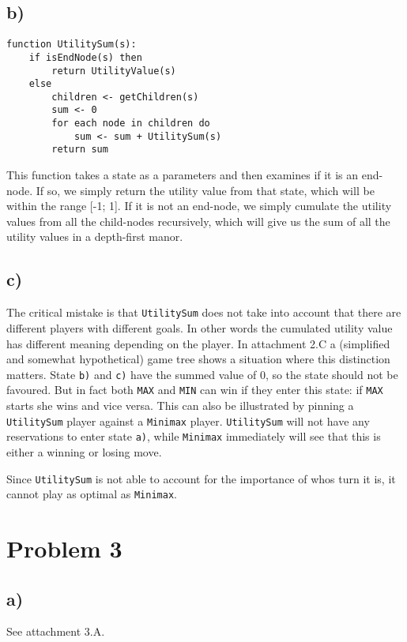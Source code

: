 \documentclass[12pt,a4paper]{article}
\begin{document}
\subsection*{b)}
\begin{lstlisting}[frame=single]
function UtilitySum(s):
    if isEndNode(s) then
        return UtilityValue(s)
    else
        children <- getChildren(s)
        sum <- 0
        for each node in children do
            sum <- sum + UtilitySum(s)
        return sum
\end{lstlisting}
This function takes a state as a parameters and then examines if it is an
end-node. If so, we simply return the utility value from that state, which
will be within the range [-1; 1].
If it is not an end-node, we simply cumulate the utility values from
all the child-nodes recursively, which will give us the sum of all the
utility values in a depth-first manor.

\subsection*{c)}
The critical mistake is that \texttt{UtilitySum} does not take into
account that there are different players with different goals. In
other words the cumulated utility value has different meaning depending
on the player. In attachment 2.C a (simplified and somewhat hypothetical)
game tree shows a
situation where this distinction matters. State \texttt{b)} and \texttt{c)}
have the summed value of 0, so the state should not be favoured. But in fact
both \texttt{MAX} and \texttt{MIN} can win if they enter this state: if
\texttt{MAX} starts she wins and vice versa. This can also be illustrated
by pinning a \texttt{UtilitySum} player against a \texttt{Minimax} player.
\texttt{UtilitySum} will not have any reservations to enter state \texttt{a)},
while \texttt{Minimax} immediately will see that this is either a winning
or losing move.

Since \texttt{UtilitySum} is not
able to account for the importance of whos turn it is, it cannot play as
optimal as \texttt{Minimax}.

\section*{Problem 3}
\subsection*{a)}
See attachment 3.A.
\end{document}
